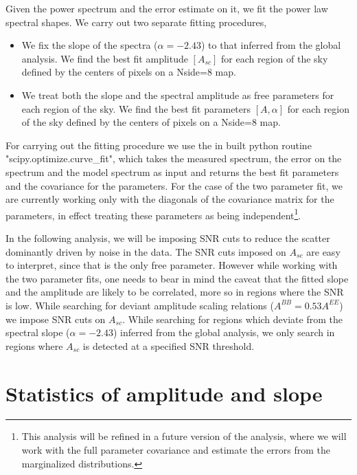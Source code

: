 \documentclass[12pt]{article}
\begin{document}
Given the power spectrum and the error estimate on it, we fit the power law spectral shapes. We carry out two separate fitting procedures,
\begin{itemize}
\item We fix the slope of the spectra ($\alpha=-2.43$) to that inferred from the global analysis. We find the best fit amplitude $[A_{sc}]$ for each region of the sky defined by the centers of pixels on a Nside=8 map.
\item We treat both the slope and the spectral amplitude as free parameters for each region of the sky. We find the best fit parameters $[A,\alpha]$ for each region of the sky defined by the centers of pixels on a Nside=8 map.
\end{itemize}
For carrying out the fitting procedure we use the in built python routine "scipy.optimize.curve\_fit", which takes the measured spectrum, the error on the spectrum and the model spectrum as input and returns the best fit parameters and the covariance for the parameters. For the case of the two parameter fit, we are currently working only with the diagonals of the covariance matrix for the parameters, in effect treating these parameters as being independent\footnote{This analysis will be refined in a future version of the analysis, where we will work with the full parameter covariance and estimate the errors from the marginalized distributions.}.

In the following analysis, we will be imposing SNR cuts to reduce the scatter dominantly driven by noise in the data. The SNR cuts imposed on $A_{sc}$ are easy to interpret, since that is the only free parameter. However while working with the two parameter fits, one needs to bear in mind the caveat that the fitted slope and the amplitude are likely to be correlated, more so in regions where the SNR is low. While searching for deviant amplitude scaling relations ($A^{BB} = 0.53 A^{EE}$)  we impose SNR cuts on $A_{sc}$. While searching for regions which deviate from the spectral slope ($\alpha=-2.43$) inferred from the global analysis, we only search in regions where $A_{sc}$ is detected at a specified SNR threshold.

\section{Statistics of amplitude and slope}
\end{document}
